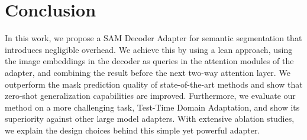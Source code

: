 \section{Conclusion}
\label{sec:samda_conclusion}
In this work, we propose a SAM Decoder Adapter for semantic segmentation that introduces negligible overhead. We achieve this by using a lean approach, using the image embeddings in the decoder as queries in the attention modules of the adapter, and combining the result before the next two-way attention layer. We outperform the mask prediction quality of state-of-the-art methods and show that zero-shot generalization capabilities are improved. Furthermore, we evaluate our method on a more challenging task, Test-Time Domain Adaptation, and show its superiority against other large model adapters. With extensive ablation studies, we explain the design choices behind this simple yet powerful adapter.
